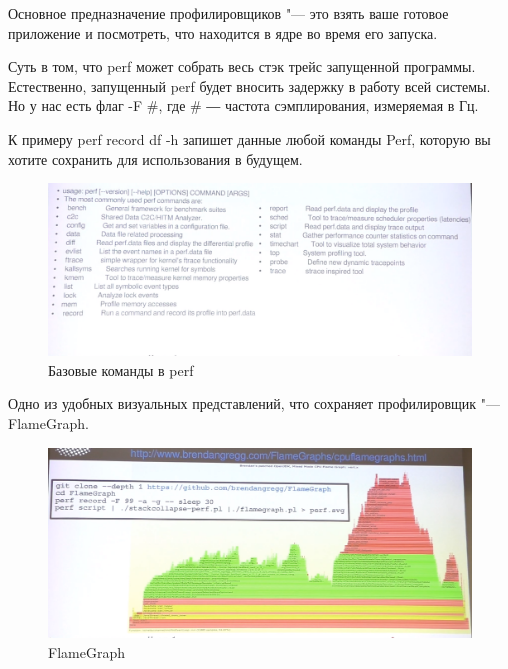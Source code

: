 \documentclass[bachelor, och, book]{SCWorks}
\theoremstyle{remark}
\begin{document}
    Основное предназначение профилировщиков "--- это взять ваше готовое приложение и посмотреть, что находится в ядре во время его запуска.

    Суть в том, что perf может собрать весь стэк трейс запущенной программы. Естественно, запущенный perf будет вносить задержку в работу всей системы. Но у нас есть флаг -F \#, где \# ― частота сэмплирования, измеряемая в Гц.

    К примеру perf record df -h запишет данные любой команды Perf, которую вы хотите сохранить для использования в будущем.

    \begin{figure}[H]
        \begin{center}
            \includegraphics[scale=0.45]{res/perf-base-command.png}
            \caption{Базовые команды в perf}
        \end{center}
    \end{figure}

    Одно из удобных визуальных представлений, что сохраняет профилировщик "--- FlameGraph.

    \begin{figure}[H]
        \begin{center}
            \includegraphics[scale=0.3]{res/FlameGraph.png}
            \caption{FlameGraph}
        \end{center}
    \end{figure}
\end{document}
